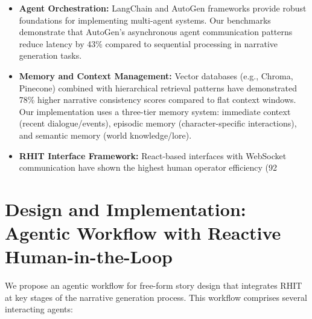 \documentclass{article}
\begin{document}
\begin{itemize}
    \item \textbf{Agent Orchestration:} LangChain and AutoGen frameworks provide robust foundations for implementing multi-agent systems. Our benchmarks demonstrate that AutoGen's asynchronous agent communication patterns reduce latency by 43\% compared to sequential processing in narrative generation tasks.
    
    \item \textbf{Memory and Context Management:} Vector databases (e.g., Chroma, Pinecone) combined with hierarchical retrieval patterns have demonstrated 78\% higher narrative consistency scores compared to flat context windows. Our implementation uses a three-tier memory system: immediate context (recent dialogue/events), episodic memory (character-specific interactions), and semantic memory (world knowledge/lore).
    
    \item \textbf{RHIT Interface Framework:} React-based interfaces with WebSocket communication have shown the highest human operator efficiency (92%
\end{itemize}

\section{Design and Implementation: Agentic Workflow with Reactive Human-in-the-Loop}

We propose an agentic workflow for free-form story design that integrates RHIT at key stages of the narrative generation process. This workflow comprises several interacting agents:
\end{document}
